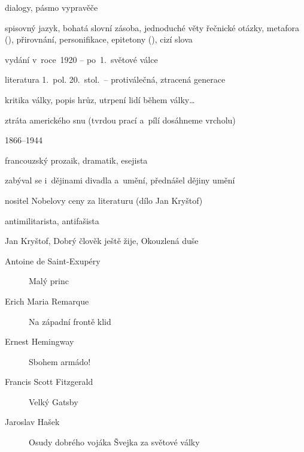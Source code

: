 { %
dialogy, pásmo vypravěče

\newpart

spisovný jazyk, bohatá slovní zásoba, jednoduché věty
řečnické otázky, metafora (),
přirovnání, personifikace, epitetony (), cizí slova

\begin{compactitem}
	\item vydání v~roce~1920 -- po~1.~světové válce
	\item literatura 1.~pol. 20.~stol.~-- protiválečná, ztracená generace
	\item kritika války, popis hrůz, utrpení lidí během války\dots
	\item ztráta amerického snu (tvrdou prací a~pílí dosáhneme vrcholu)
\end{compactitem}

\parag{\getauthor}
\begin{compactitem}
	\item 1866--1944
	\item francouzský prozaik, dramatik, esejista
	\item zabýval se i~dějinami divadla a~umění, přednášel dějiny umění
	\item nositel Nobelovy ceny za literaturu (dílo Jan Kryštof)
	\item antimilitarista, antifašista
	\item Jan Kryštof, Dobrý člověk ještě žije, Okouzlená duše
\end{compactitem}

\begin{description}
	\item[Antoine de Saint-Exupéry] Malý princ
	\item[Erich Maria Remarque] Na západní frontě klid
	\item[Ernest Hemingway] Sbohem armádo!
	\item[Francis Scott Fitzgerald] Velký Gatsby
	\item[Jaroslav Hašek] Osudy dobrého vojáka Švejka za světové války
\end{description}
}
